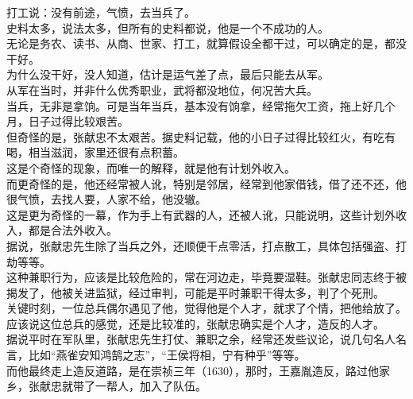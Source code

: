 \begin{multicols}{\theparacolNo}
打工说：没有前途，气愤，去当兵了。\\

史料太多，说法太多，但所有的史料都说，他是一个不成功的人。\\

无论是务农、读书、从商、世家、打工，就算假设全都干过，可以确定的是，都没干好。\\

为什么没干好，没人知道，估计是运气差了点，最后只能去从军。\\

从军在当时，并非什么优秀职业，武将都没地位，何况苦大兵。\\

当兵，无非是拿饷。可是当年当兵，基本没有饷拿，经常拖欠工资，拖上好几个月，日子过得比较艰苦。\\

但奇怪的是，张献忠不太艰苦。据史料记载，他的小日子过得比较红火，有吃有喝，相当滋润，家里还很有点积蓄。\\

这是个奇怪的现象，而唯一的解释，就是他有计划外收入。\\

而更奇怪的是，他还经常被人讹，特别是邻居，经常到他家借钱，借了还不还，他很气愤，去找人要，人家不给，他没辙。\\

这是更为奇怪的一幕，作为手上有武器的人，还被人讹，只能说明，这些计划外收入，都是合法外收入。\\

据说，张献忠先生除了当兵之外，还顺便干点零活，打点散工，具体包括强盗、打劫等等。\\

这种兼职行为，应该是比较危险的，常在河边走，毕竟要湿鞋。张献忠同志终于被揭发了，他被关进监狱，经过审判，可能是平时兼职干得太多，判了个死刑。\\

关键时刻，一位总兵偶尔遇见了他，觉得他是个人才，就求了个情，把他给放了。\\

应该说这位总兵的感觉，还是比较准的，张献忠确实是个人才，造反的人才。\\

据说平时在军队里，张献忠先生打仗、兼职之余，经常还发些议论，说几句名人名言，比如“燕雀安知鸿鹄之志”，“王侯将相，宁有种乎”等等。\\

而他最终走上造反道路，是在崇祯三年（1630），那时，王嘉胤造反，路过他家乡，张献忠就带了一帮人，加入了队伍。\\


\end{multicols}
